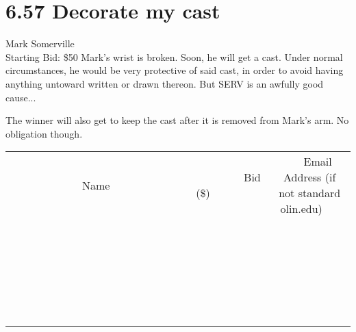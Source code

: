 \documentclass[11pt]{article}
\begin{document}
\section*{6.57 Decorate my cast}
Mark Somerville
\\
Starting Bid: \$50
\newline
Mark's wrist is broken.  Soon, he will get a cast.  Under normal circumstances, he would be very protective of said cast, in order to avoid having anything untoward written or drawn thereon.  But SERV is an awfully good cause... 

The winner will also get to keep the cast after it is removed from Mark's arm. No obligation though.
\\[6ex]
\begin{tabular}{c c c}
~~~~~~~~~~~~~Name~~~~~~~~~~~~~ & ~~~~~~~~~Bid (\$)~~~~~~~~~  & ~~~Email Address (if not standard olin.edu)~~~\\
 & & \\
\hline
 & & \\
\hline
 & & \\
\hline
 & & \\
\hline
 & & \\
\hline
 & & \\
\hline
 & & \\
\hline
 & & \\
\hline
 & & \\
\hline
 & & \\
\hline
 & & \\
\hline
 & & \\
\hline
 & & \\
\hline
 & & \\
\hline
 & & \\
\hline
 & & \\
\hline
 & & \\
\hline
 & & \\
\hline
 & & \\
\hline
 & & \\
\hline
 & & \\
\hline
 & & \\
\hline
 & & \\
\hline
 & & \\
\hline
 & & \\
\hline
 & & \\
\hline
\end{tabular}
\newpage
\end{document}

